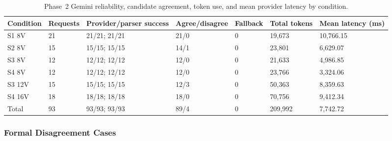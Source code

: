 \documentclass[letterpaper,10pt,conference]{ieeeconf}
\begin{document}
\begin{table}[t]

\centering

\caption{Phase~2 Gemini reliability, candidate agreement, token use, and mean provider latency by condition.}

\label{tab:phase2_reliability}

\renewcommand{\arraystretch}{1.08}

\footnotesize

\begin{tabular}{p{1.45cm} p{1.15cm} p{2.05cm} p{1.65cm} p{1.1cm} p{1.8cm} p{1.75cm}}

\toprule

\textbf{Condition} & \textbf{Requests} & \textbf{Provider/parser success} & \textbf{Agree/disagree} & \textbf{Fallback} & \textbf{Total tokens} & \textbf{Mean latency (ms)} \\

\midrule

S1 8V & 21 & 21/21; 21/21 & 21/0 & 0 & 19,673 & 10,766.15 \\

S2 8V & 15 & 15/15; 15/15 & 14/1 & 0 & 23,801 & 6,629.07 \\

S3 8V & 12 & 12/12; 12/12 & 12/0 & 0 & 21,633 & 4,986.85 \\

S4 8V & 12 & 12/12; 12/12 & 12/0 & 0 & 23,766 & 3,324.06 \\

S3 12V & 15 & 15/15; 15/15 & 12/3 & 0 & 50,363 & 8,359.63 \\

S4 16V & 18 & 18/18; 18/18 & 18/0 & 0 & 70,756 & 9,412.34 \\

\midrule

Total & 93 & 93/93; 93/93 & 89/4 & 0 & 209,992 & 7,742.72 \\

\bottomrule

\end{tabular}

\end{table}



\subsubsection{Formal Disagreement Cases}
\end{document}
